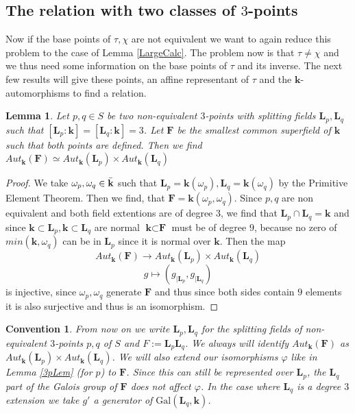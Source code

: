 \documentclass[12pt, oneside, reqno]{amsart}
\newtheorem{lemma}[theorem]{Lemma}
\newtheorem{convention}[theorem]{Convention}
\begin{document}
\subsection{The relation with two classes of $3$-points}
Now if the base points of $\tau,\chi$ are not equivalent we want to again reduce this problem to the case of Lemma \ref{LargeCalc}. The problem now is that $\tau \neq \chi$ and we thus need some information on the base points of $\tau$ and its inverse. The next few results will give these points, an affine representant of $\tau$ and the $\textbf{k}$-automorphisms to find a relation.
\begin{lemma}
    Let $p,q \in S$ be two non-equivalent $3$-points with splitting fields $\textbf{L}_p, \textbf{L}_q$ such that $ [\textbf{L}_p:\textbf{k}] = [\textbf{L}_q:\textbf{k}]=3$. Let $\textbf{F}$ be the smallest common superfield of $\textbf{k}$ such that both points are defined. Then we find $Aut_{\textbf{k}}(\textbf{F}) \simeq Aut_{\textbf{k}}(\textbf{L}_p) \times Aut_{\textbf{k}}(\textbf{L}_q)$ 
\end{lemma}
\begin{proof}
    We take $\omega_p, \omega_q \in \Bar{\textbf{k}}$ such that $\textbf{L}_p = \textbf{k}(\omega_p), \textbf{L}_q = \textbf{k}(\omega_q)$ by the Primitive Element Theorem. Then we find, that $\textbf{F} = \textbf{k}(\omega_p,\omega_q)$. Since $p,q$ are non equivalent and both field extentions are of degree $3$, we find that $\textbf{L}_p \cap \textbf{L}_q = \textbf{k}$ and since $\textbf{k} \subset \textbf{L}_p, \textbf{k} \subset \textbf{L}_q$ are normal $\textbf{k} \subset \textbf{F}$ must be of degree $9$, because no zero of $min(\textbf{k}, \omega_q)$ can be in $\textbf{L}_p$ since it is normal over $\textbf{k}$. Then the map
    \[ Aut_{\textbf{k}}(\textbf{F}) \rightarrow Aut_{\textbf{k}}(\textbf{L}_p) \times Aut_{\textbf{k}}(\textbf{L}_q)\]
    \[g \mapsto (g_{|\textbf{L}_p}, g_{|\textbf{L}_q})\]
    is injective, since $\omega_p, \omega_q$ generate $\textbf{F}$ and thus since both sides contain $9$ elements it is also surjective and thus is an isomorphism.
    \newline
\end{proof}
\begin{convention} \label{con:2SF}
    From now on we write $\textbf{L}_p, \textbf{L}_q$ for the splitting fields of non-equivalent $3$-points $p,q$ of $S$ and $F := \textbf{L}_p\textbf{L}_q$. We always will identify $Aut_{\textbf{k}}(\textbf{F} )$ as $ Aut_{\textbf{k}}(\textbf{L}_p) \times Aut_{\textbf{k}}(\textbf{L}_q)$. We will also extend our isomorphisms $\varphi$ like in Lemma \ref{3pLem} (for $p$) to $\textbf{F}$. Since this can still be represented over $\textbf{L}_p$, the $\textbf{L}_q$ part of the Galois group of $\textbf{F}$ does not affect $\varphi$. In the case where $\textbf{L}_q$ is a degree $3$ extension we take $g'$ a generator of $\textrm{Gal}(\textbf{L}_q,\textbf{k})$. 
\end{convention}
\end{document}
